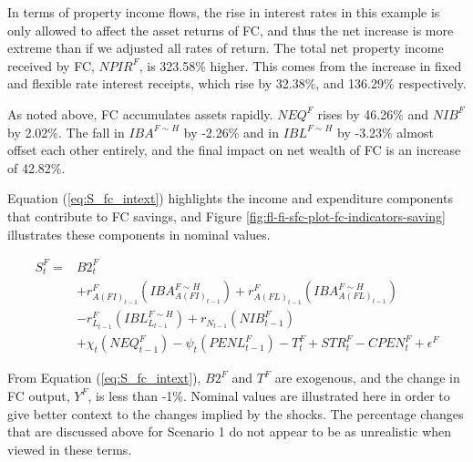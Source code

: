 \documentclass[
]{book}
\begin{document}
In terms of property income flows, the rise in interest rates in this example is only allowed to affect the asset returns of FC, and thus the net increase is more extreme than if we adjusted all rates of return. The total net property income received by FC, \(NPIR^F\), is 323.58\% higher. This comes from the increase in fixed and flexible rate interest receipts, which rise by 32.38\%, and 136.29\% respectively.

As noted above, FC accumulates assets rapidly. \(NEQ^F\) rises by 46.26\% and \(NIB^F\) by 2.02\%. The fall in \(IBA^{F\sim H}\) by -2.26\% and in \(IBL^{F\sim H}\) by -3.23\% almost offset each other entirely, and the final impact on net wealth of FC is an increase of 42.82\%.

Equation (\ref{eq:S_fc_intext}) highlights the income and expenditure components that contribute to FC savings, and Figure \ref{fig:fl-fi-sfc-plot-fc-indicators-saving} illustrates these components in nominal values.

\begin{equation}
\begin{split}
    S^F_t = & B2^F_t \\
            & + r^F_{A(FI)_{t-1}}(IBA^{F\sim H}_{A(FI)_{t-1}}) + r^F_{A(FL)_{t-1}}(IBA^{F\sim H}_{A(FL)_{t-1}}) \\
            & - r^F_{L_{t-1}}(IBL^{F\sim H}_{L_{t-1}}) + r_{N_{t-1}}(NIB^F_{t-1}) \\
            & + \chi _t(NEQ^F_{t-1}) -\psi _t(PENL^F_{t-1}) - T^F_t + STR^F_t - CPEN^F_t + \epsilon ^F
\end{split}
\label{eq:S_fc_intext}
\end{equation}

From Equation (\ref{eq:S_fc_intext}), \(B2^F\) and \(T^F\) are exogenous, and the change in FC output, \(Y^F\), is less than -1\%. Nominal values are illustrated here in order to give better context to the changes implied by the shocks. The percentage changes that are discussed above for Scenario 1 do not appear to be as unrealistic when viewed in these terms.
\end{document}
